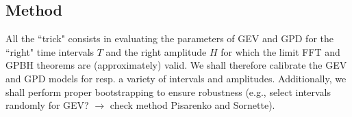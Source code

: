 \subsection*{Method}
All the ``trick" consists in evaluating the parameters of GEV and GPD for the ``right" time intervals $T$ and the right amplitude $H$ for which the limit FFT and GPBH theorems are (approximately) valid. We shall therefore calibrate the GEV and GPD models for resp. a variety of intervals and amplitudes. Additionally, we shall perform proper bootstrapping to ensure robustness (e.g., select intervals randomly for GEV? $\rightarrow$ check method Pisarenko and Sornette).














